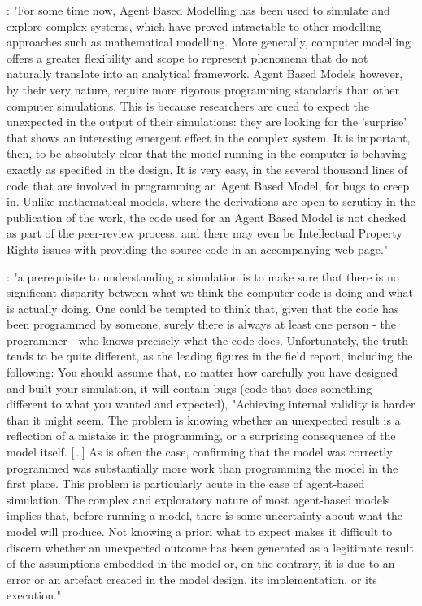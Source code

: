
\cite{polhill_ghost_2005}: "For some time now, Agent Based Modelling has been used to simulate and explore complex systems, which have proved intractable to other modelling approaches such as mathematical modelling. More generally, computer modelling offers a greater flexibility and scope to represent phenomena that do not naturally translate into an analytical framework. Agent Based Models however, by their very nature, require more rigorous programming standards than other computer simulations. This is because researchers are cued to expect the unexpected in the output of their simulations: they are looking for the 'surprise' that shows an interesting emergent effect in the complex system. It is important, then, to be absolutely clear that the model running in the computer is behaving exactly as specified in the design. It is very easy, in the several thousand lines of code that are involved in programming an Agent Based Model, for bugs to creep in. Unlike mathematical models, where the derivations are open to scrutiny in the publication of the work, the code used for an Agent Based Model is not checked as part of the peer-review process, and there may even be Intellectual Property Rights issues with providing the source code in an accompanying web page."

\cite{galan_errors_2009}: "a prerequisite to understanding a simulation is to make sure that there is no significant disparity between what we think the computer code is doing and what is actually doing. One could be tempted to think that, given that the code has been programmed by someone, surely there is always at least one person - the programmer - who knows precisely what the code does. Unfortunately, the truth tends to be quite different, as the leading figures in the field report, including the following: You should assume that, no matter how carefully you have designed and built your simulation, it will contain bugs (code that does something different to what you wanted and expected), "Achieving internal validity is harder than it might seem. The problem is knowing whether an unexpected result is a reflection of a mistake in the programming, or a surprising consequence of the model itself. […] As is often the case, confirming that the model was correctly programmed was substantially more work than programming the model in the first place. This problem is particularly acute in the case of agent-based simulation. The complex and exploratory nature of most agent-based models implies that, before running a model, there is some uncertainty about what the model will produce. Not knowing a priori what to expect makes it difficult to discern whether an unexpected outcome has been generated as a legitimate result of the assumptions embedded in the model or, on the contrary, it is due to an error or an artefact created in the model design, its implementation, or its execution."

